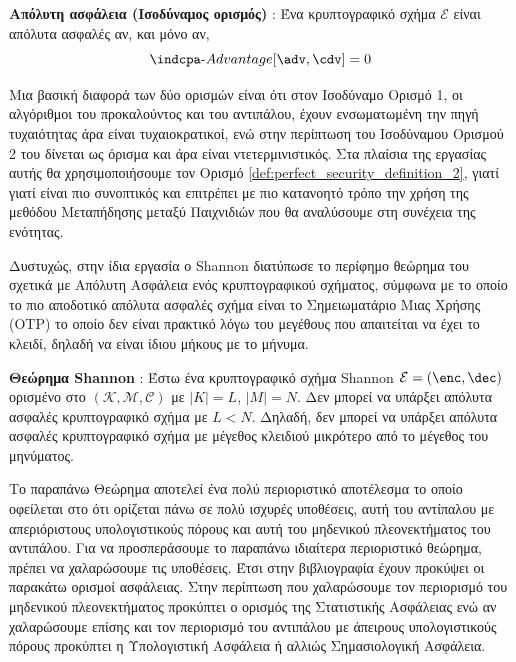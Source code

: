 \begin{definition}
\label{def:perfect_security_2}
\textbf{Απόλυτη ασφάλεια (Ισοδύναμος ορισμός)} : Ένα κρυπτογραφικό σχήμα $\mathcal{E}$ είναι απόλυτα ασφαλές αν, και μόνο αν, 
$$\indcpa\text{-}Advantage[\adv, \cdv] = 0$$
\end{definition}

Μια βασική διαφορά των δύο ορισμών είναι ότι στον Ισοδύναμο Ορισμό 1, οι αλγόριθμοι του προκαλούντος και του αντιπάλου, έχουν ενσωματωμένη την πηγή τυχαιότητας άρα είναι τυχαιοκρατικοί, ενώ στην περίπτωση του Ισοδύναμου Ορισμού 2 του δίνεται ως όρισμα και άρα είναι ντετερμινιστικός. Στα πλαίσια της εργασίας αυτής θα χρησιμοποιήσουμε τον Ορισμό \ref{def:perfect_security_definition_2}, γιατί γιατί είναι πιο συνοπτικός και επιτρέπει με πιο κατανοητό τρόπο την χρήση της μεθόδου Μεταπήδησης μεταξύ Παιχνιδιών που θα αναλύσουμε στη συνέχεια της ενότητας.

Δυστυχώς, στην ίδια εργασία \cite{shannon1945mathematical} ο Shannon διατύπωσε το περίφημο θεώρημα του σχετικά με Απόλυτη Ασφάλεια ενός κρυπτογραφικού σχήματος, σύμφωνα με το οποίο το πιο αποδοτικό απόλυτα ασφαλές σχήμα είναι το Σημειωματάριο Μιας Χρήσης (OTP) το οποίο δεν είναι πρακτικό λόγω του μεγέθους που απαιτείται να έχει το κλειδί, δηλαδή να είναι ίδιου μήκους με το μήνυμα.


\begin{definition}
\label{shannon_theorem}
\textbf{Θεώρημα Shannon} : Έστω ένα κρυπτογραφικό σχήμα Shannon $\mathcal{E}=(\enc, \dec)$ ορισμένο στο $(\mathcal{K},\mathcal{M},\mathcal{C})$ με $|Κ|=L$, $|M|=N$. Δεν μπορεί να υπάρξει απόλυτα ασφαλές κρυπτογραφικό σχήμα με $L < N$. Δηλαδή, δεν μπορεί να υπάρξει απόλυτα ασφαλές κρυπτογραφικό σχήμα με μέγεθος κλειδιού μικρότερο από το μέγεθος του μηνύματος.
\end{definition}

Το παραπάνω Θεώρημα αποτελεί ένα πολύ περιοριστικό αποτέλεσμα το οποίο οφείλεται στο ότι ορίζεται πάνω σε πολύ ισχυρές υποθέσεις, αυτή του αντίπαλου με απεριόριστους υπολογιστικούς πόρους και αυτή του μηδενικού πλεονεκτήματος του αντιπάλου. Για να προσπεράσουμε το παραπάνω ιδιαίτερα περιοριστικό θεώρημα, πρέπει να χαλαρώσουμε τις υποθέσεις. Έτσι στην βιβλιογραφία έχουν προκύψει οι παρακάτω ορισμοί ασφάλειας. Στην περίπτωση που χαλαρώσουμε τον περιορισμό του μηδενικού πλεονεκτήματος προκύπτει ο ορισμός της Στατιστικής Ασφάλειας ενώ αν χαλαρώσουμε επίσης και τον περιορισμό του αντιπάλου με άπειρους υπολογιστικούς πόρους προκύπτει η Υπολογιστική Ασφάλεια ή αλλιώς Σημασιολογική Ασφάλεια.

